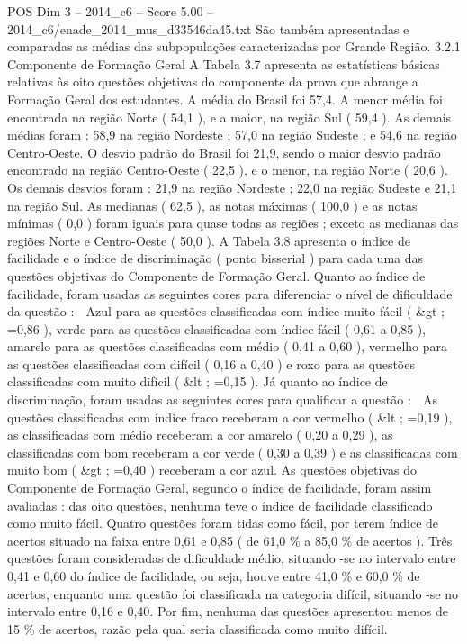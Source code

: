 \begin{textsample}{POS Dim 3 – 2014\_c6 – Score 5.00 – 2014\_c6/enade\_2014\_mus\_d33546da45.txt}
São também apresentadas e comparadas as médias das subpopulações caracterizadas por Grande Região. 3.2.1 Componente de Formação Geral A Tabela 3.7 apresenta as estatísticas básicas relativas às oito questões objetivas do componente da prova que abrange a Formação Geral dos estudantes.
A média do Brasil foi 57,4.
A menor média foi encontrada na região Norte ( 54,1 ), e a maior, na região Sul ( 59,4 ).
As demais médias foram : 58,9 na região Nordeste ; 57,0 na região Sudeste ; e 54,6 na região Centro-Oeste.
O desvio padrão do Brasil foi 21,9, sendo o maior desvio padrão encontrado na região Centro-Oeste ( 22,5 ), e o menor, na região Norte ( 20,6 ).
Os demais desvios foram : 21,9 na região Nordeste ; 22,0 na região Sudeste e 21,1 na região Sul.
As medianas ( 62,5 ), as notas máximas ( 100,0 ) e as notas mínimas ( 0,0 ) foram iguais para quase todas as regiões ; exceto as medianas das regiões Norte e Centro-Oeste ( 50,0 ).
A Tabela 3.8 apresenta o índice de facilidade e o índice de discriminação ( ponto bisserial ) para cada uma das questões objetivas do Componente de Formação Geral.
Quanto ao índice de facilidade, foram usadas as seguintes cores para diferenciar o nível de dificuldade da questão :  Azul para as questões classificadas com índice muito fácil ( \&gt ; =0,86 ), verde para as questões classificadas com índice fácil ( 0,61 a 0,85 ), amarelo para as questões classificadas com médio ( 0,41 a 0,60 ), vermelho para as questões classificadas com difícil ( 0,16 a 0,40 ) e roxo para as questões classificadas com muito difícil ( \&lt ; =0,15 ).
Já quanto ao índice de discriminação, foram usadas as seguintes cores para qualificar a questão :  As questões classificadas com índice fraco receberam a cor vermelho ( \&lt ; =0,19 ), as classificadas com médio receberam a cor amarelo ( 0,20 a 0,29 ), as classificadas com bom receberam a cor verde ( 0,30 a 0,39 ) e as classificadas com muito bom ( \&gt ; =0,40 ) receberam a cor azul.
As questões objetivas do Componente de Formação Geral, segundo o índice de facilidade, foram assim avaliadas : das oito questões, nenhuma teve o índice de facilidade classificado como muito fácil.
Quatro questões foram tidas como fácil, por terem índice de acertos situado na faixa entre 0,61 e 0,85 ( de 61,0 \% a 85,0 \% de acertos ).
Três questões foram consideradas de dificuldade médio, situando -se no intervalo entre 0,41 e 0,60 do índice de facilidade, ou seja, houve entre 41,0 \% e 60,0 \% de acertos, enquanto uma questão foi classificada na categoria difícil, situando -se no intervalo entre 0,16 e 0,40.
Por fim, nenhuma das questões apresentou menos de 15 \% de acertos, razão pela qual seria classificada como muito difícil.

\end{textsample}
